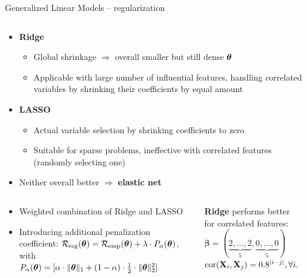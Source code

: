 \documentclass[11pt,compress,t,notes=noshow, xcolor=table]{beamer}
\begin{document}
\begin{vbframe}{Generalized Linear Models -- regularization}
\begin{columns}[T, totalwidth=\textwidth]
\begin{column}{0.62\textwidth}
\begin{itemize}
  \item \textbf{Ridge}
  \begin{itemize} 
    \item Global shrinkage $\Rightarrow$ overall smaller but still dense $\bm{\theta}$
    \item Applicable with large number of influential features, handling 
    correlated variables by shrinking their coefficients by equal amount
  \end{itemize}
  \item \textbf{LASSO}
  \begin{itemize} 
    \item Actual variable selection by shrinking coefficients to zero
    \item Suitable for sparse problems, ineffective with correlated 
    features (randomly selecting one)
  \end{itemize}  
  \item Neither overall better $\Rightarrow$ \textbf{elastic net}
\end{itemize}
\end{column}
\end{columns}

\begin{columns}[T, totalwidth=\textwidth]
  \begin{column}{0.62\textwidth}

  \begin{itemize} 
    \item Weighted combination of Ridge and LASSO
    \item Introducing additional penalization coefficient: %
    $\mathcal{R}_{\text{reg}}(\bm{\theta}) = \mathcal{R}_{\text{emp}}(\bm{\theta}) 
    + \lambda \cdot P_{\alpha}(\bm{\theta})$, with\\
    $P_{\alpha}(\bm{\theta}) = [\alpha \cdot \|\bm{\theta}\|_1 + (1 - \alpha) \cdot \frac{1}{2} \cdot \|\bm{\theta}\|_2^2]$
  \end{itemize}  


\end{column}

\begin{column}{0.38\textwidth}
\tiny
\centering
\begin{columns}[T, totalwidth=\textwidth]
\begin{column}{0.5\textwidth}
\tiny
\begin{center}
\textbf{Ridge} performs better for correlated features: \\ 
\medskip
$\boldsymbol{\beta}=(\underbrace{2,\ldots,2}_{5},\underbrace{0,\ldots,0}_{5})$\\
$ \operatorname{cor}(\mathbf{X}_{i},\mathbf{X}_{j})=0.8^{|i-j|}, \forall i, j$
  \end{center}
\end{column}
\begin{column}{0.5\textwidth} \tiny


\end{column}
\end{columns}
\end{column}
\end{columns}
\end{vbframe}
\end{document}
